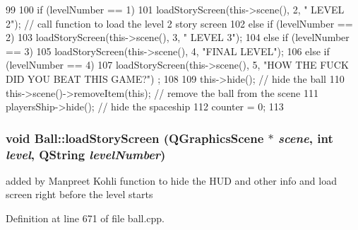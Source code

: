 \begin{DoxyCode}
99 {
100     if (levelNumber == 1)
101         loadStoryScreen(this->scene(), 2, "    LEVEL 2");     // call function to
       load the level 2 story screen
102     else if (levelNumber == 2)
103         loadStoryScreen(this->scene(), 3, "    LEVEL 3");
104     else if (levelNumber == 3)
105         loadStoryScreen(this->scene(), 4, "FINAL LEVEL");
106     else if (levelNumber == 4)
107         loadStoryScreen(this->scene(), 5, "HOW THE FUCK DID YOU BEAT THIS GAME?")
      ;
108 
109     this->hide();                           // hide the ball
110     this->scene()->removeItem(this);        // remove the ball from the scene
111     playersShip->hide();                    // hide the spaceship
112     counter = 0;
113 }
\end{DoxyCode}
\hypertarget{class_ball_ad6e9abee09d5e6f9834071bd2045e312}{
\subsubsection[{loadStoryScreen}]{\setlength{\rightskip}{0pt plus 5cm}void Ball::loadStoryScreen (QGraphicsScene $\ast$ {\em scene}, \/  int {\em level}, \/  QString {\em levelNumber})}}
\label{class_ball_ad6e9abee09d5e6f9834071bd2045e312}
added by Manpreet Kohli function to hide the HUD and other info and load screen right before the level starts 

Definition at line 671 of file ball.cpp.


